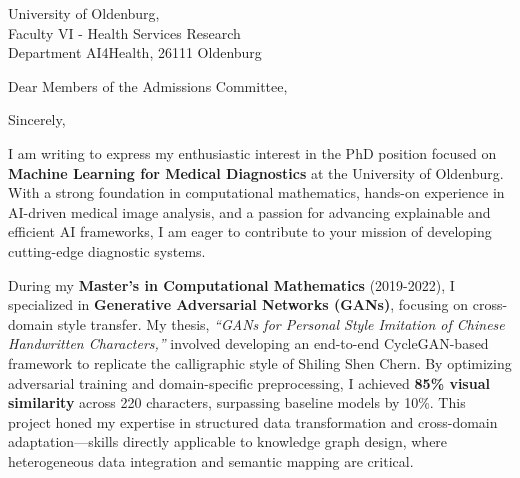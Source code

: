 \documentclass[11pt,a4paper, final]{moderncv}
\begin{document}
{University of Oldenburg,\\
Faculty VI - Health Services Research\\
Department AI4Health, 26111 Oldenburg\\
}
\date{\today}
\opening{Dear Members of the Admissions Committee,}
\closing{Sincerely,}
\makelettertitle
\thispagestyle{empty}
\pagestyle{empty}
I am writing to express my enthusiastic interest in the PhD position focused on 
\textbf{Machine Learning for Medical Diagnostics} at the University of Oldenburg. 
With a strong foundation in computational mathematics, 
hands-on experience in AI-driven medical image analysis, 
and a passion for advancing explainable and efficient AI frameworks, 
I am eager to contribute to your mission of developing cutting-edge diagnostic systems.

During my \textbf{Master's in Computational Mathematics} (2019-2022), 
I specialized in \textbf{Generative Adversarial Networks (GANs)}, 
focusing on cross-domain style transfer. 
My thesis, \emph{``GANs for Personal Style Imitation of Chinese Handwritten Characters,''} 
involved developing an end-to-end CycleGAN-based framework to replicate the calligraphic style of Shiling Shen Chern. 
By optimizing adversarial training and domain-specific preprocessing, 
I achieved \textbf{85\% visual similarity} across 220 characters, surpassing baseline models by 10\%. 
This project honed my expertise in structured data transformation and cross-domain adaptation—skills directly applicable to knowledge graph design, where heterogeneous data integration and semantic mapping are critical.
\end{document}
